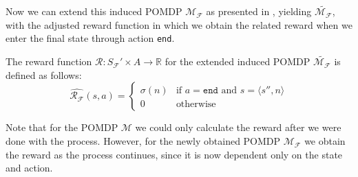Now we can extend this induced POMDP $\mathcal{M}_\mathcal{F}$ as presented in , yielding $\widetilde{\mathcal{M}_\mathcal{F}}$, with the adjusted reward function in which we obtain the related reward when we enter the final state through action \texttt{end}.

\begin{definition}
	\label{d:reward-fuction-extended-induced-pomdp}
	The reward function $\mathcal{R}:S_\mathcal{F}'\times A\to \mathbb{R}$ for the extended induced POMDP $\widetilde{\mathcal{M}_{\mathcal{F}}}$ is defined as follows:
	\[\widehat{\mathcal{R}_\mathcal{F}}(s,a) = \begin{cases}
		\sigma(n) & \text{if } a=\texttt{end} \text{ and } s=\langle s'',n\rangle \\
		0 & \text{otherwise} 
		\end{cases}
	\]
\end{definition}

Note that for the POMDP $\mathcal{M}$ we could only calculate the reward after we were done with the process. However, for the newly obtained POMDP $\mathcal{M}_{\mathcal{F}}$ we obtain the reward as the process continues, since it is now dependent only on the state and action.